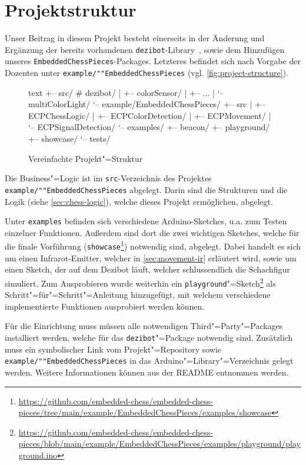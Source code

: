 
\section{Projektstruktur}
\label{sec:final-project-structure}

Unser Beitrag in diesem Projekt besteht einerseits in der Änderung und Ergänzung der bereits vorhandenen \texttt{dezibot}-Library~\cite{dezibotteamDezibotDezibot2025}, sowie dem Hinzufügen unseres \texttt{Embedded\-Chess\-Pieces}-Packages. Letzteres befindet sich nach Vorgabe der Dozenten unter \texttt{example/""Embedded\-Chess\-Pieces} (vgl. \autoref{fig:project-structure}).

\begin{figure}[h]
\centering
\begin{cminted}{text}
+-- src/              # dezibot/
|   +-- colorSensor/
|   +-- ...
|   `-- multiColorLight/
`-- example/EmbeddedChessPieces/
    +-- src
    |   +-- ECPChessLogic/
    |   +-- ECPColorDetection/
    |   +-- ECPMovement/
    |   `-- ECPSignalDetection/
    `-- examples/
        +-- beacon/
        +-- playground/
        +-- showcase/
        `-- tests/
\end{cminted}
\caption{Vereinfachte Projekt"=Struktur}
\label{fig:project-structure}
\end{figure}

Die Business"=Logic ist im \texttt{src}-Verzeichnis des Projektes \texttt{example/""Embedded\-Chess\-Pieces} abgelegt. Darin sind die Strukturen und die Logik (siehe \autoref{sec:chess-logic}), welche dieses Projekt ermöglichen, abgelegt.

Unter \texttt{examples} befinden sich verschiedene Arduino-Sketches, u.a. zum Testen einzelner Funktionen. Außerdem sind dort die zwei wichtigen Sketches, welche für die finale Vorführung (\texttt{showcase}\footnote{\url{https://github.com/embedded-chess/embedded-chess-pieces/tree/main/example/EmbeddedChessPieces/examples/showcase}}) notwendig sind, abgelegt. Dabei handelt es sich um einen Infrarot-Emitter, welcher in \autoref{sec:movement-ir} erläutert wird, sowie um einen Sketch, der auf dem Dezibot läuft, welcher schlussendlich die Schachfigur simuliert. Zum Ausprobieren wurde weiterhin ein \texttt{playground}"=Sketch\footnote{\url{https://github.com/embedded-chess/embedded-chess-pieces/blob/main/example/EmbeddedChessPieces/examples/playground/playground.ino}} als Schritt"=für"=Schritt"=Anleitung hinzugefügt, mit welchem verschiedene implementierte Funktionen ausprobiert werden können.

Für die Einrichtung muss müssen alle notwendigen Third"=Party"=Packages installiert werden, welche für das \texttt{dezibot}"=Package notwendig sind. Zusätzlich muss ein symbolischer Link vom Projekt"=Repository sowie \texttt{example/""Embedded\-Chess\-Pieces} in das Arduino"=Library"=Verzeichnis gelegt werden. Weitere Informationen können aus der README entnommen werden.
